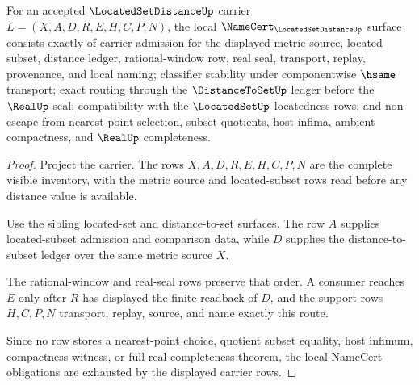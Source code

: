 \begin{theorem}
\label{thm:located-set-distance-namecert-obligations}
For an accepted $\LocatedSetDistanceUp$ carrier $L=(X,A,D,R,E,H,C,P,N)$, the local $\NameCert_{\LocatedSetDistanceUp}$ surface consists exactly of carrier admission for the displayed metric source, located subset, distance ledger, rational-window row, real seal, transport, replay, provenance, and local naming; classifier stability under componentwise $\hsame$ transport; exact routing through the $\DistanceToSetUp$ ledger before the $\RealUp$ seal; compatibility with the $\LocatedSetUp$ locatedness rows; and non-escape from nearest-point selection, subset quotients, host infima, ambient compactness, and $\RealUp$ completeness.
\end{theorem}
\begin{proof}
Project the carrier. The rows $X,A,D,R,E,H,C,P,N$ are the complete visible inventory, with the metric source and located-subset rows read before any distance value is available.

Use the sibling located-set and distance-to-set surfaces. The row $A$ supplies located-subset admission and comparison data, while $D$ supplies the distance-to-subset ledger over the same metric source $X$.

The rational-window and real-seal rows preserve that order. A consumer reaches $E$ only after $R$ has displayed the finite readback of $D$, and the support rows $H,C,P,N$ transport, replay, source, and name exactly this route.

Since no row stores a nearest-point choice, quotient subset equality, host infimum, compactness witness, or full real-completeness theorem, the local NameCert obligations are exhausted by the displayed carrier rows.
\end{proof}

